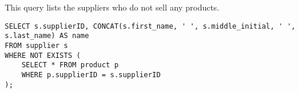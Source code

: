 This query lists the suppliers who do not sell any products.

\begin{lstlisting}
SELECT s.supplierID, CONCAT(s.first_name, ' ', s.middle_initial, ' ', s.last_name) AS name
FROM supplier s
WHERE NOT EXISTS (
    SELECT * FROM product p
    WHERE p.supplierID = s.supplierID
);
\end{lstlisting}